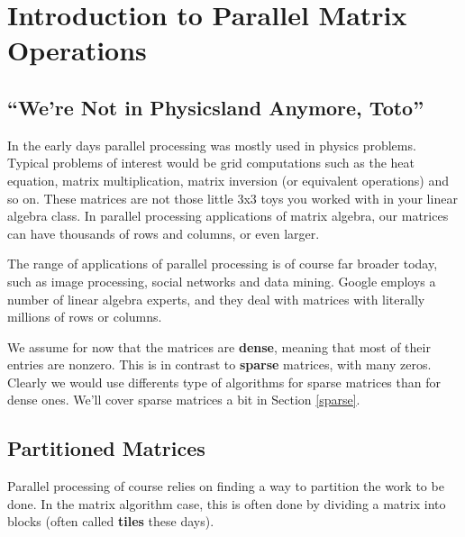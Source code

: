 \chapter{Introduction to Parallel Matrix Operations}
\label{chap:matrix}

\section{``We're Not in Physicsland Anymore, Toto''}
\label{notallphys}

In the early days parallel processing was mostly used in physics
problems.  Typical problems of interest would be grid computations such
as the heat equation, matrix multiplication, matrix inversion (or
equivalent operations) and so on.  These matrices are not those little
3x3 toys you worked with in your linear algebra class.  In parallel
processing applications of matrix algebra, our matrices can have
thousands of rows and columns, or even larger.

The range of applications of parallel processing is of course far
broader today, such as image processing, social networks and data
mining.  Google employs a number of linear algebra experts, and they
deal with matrices with literally millions of rows or columns.

We assume for now that the matrices are {\bf dense}, meaning that most
of their entries are nonzero.  This is in contrast to {\bf sparse}
matrices, with many zeros.  Clearly we would use differents type of
algorithms for sparse matrices than for dense ones.  We'll cover sparse
matrices a bit in Section \ref{sparse}.

% 

\section{Partitioned Matrices}
\label{partitioned}

Parallel processing of course relies on finding a way to partition the
work to be done.  In the matrix algorithm case, this is often done by
dividing a matrix into blocks (often called {\bf tiles} these days). 

